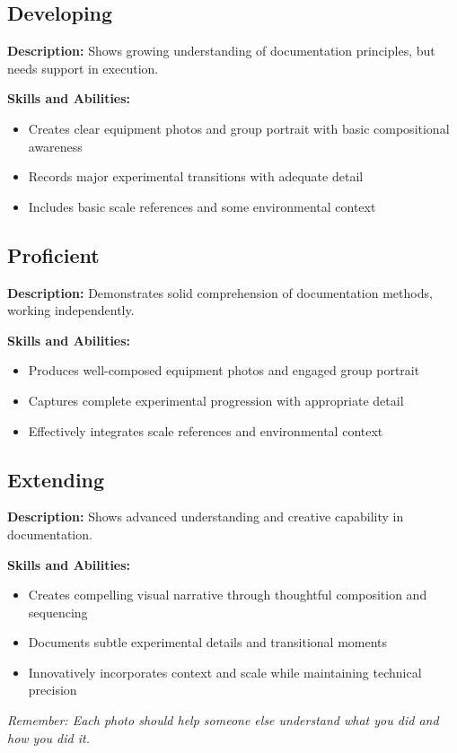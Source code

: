 \documentclass[11pt]{article}
\begin{document}
\subsection*{Developing}
\textbf{Description:} Shows growing understanding of documentation principles, but needs support in execution.

\noindent\textbf{Skills and Abilities:}
\begin{itemize}[leftmargin=*]
    \item Creates clear equipment photos and group portrait with basic compositional awareness
    \item Records major experimental transitions with adequate detail
    \item Includes basic scale references and some environmental context
\end{itemize}

\subsection*{Proficient}
\textbf{Description:} Demonstrates solid comprehension of documentation methods, working independently.

\noindent\textbf{Skills and Abilities:}
\begin{itemize}[leftmargin=*]
    \item Produces well-composed equipment photos and engaged group portrait
    \item Captures complete experimental progression with appropriate detail
    \item Effectively integrates scale references and environmental context
\end{itemize}

\subsection*{Extending}
\textbf{Description:} Shows advanced understanding and creative capability in documentation.

\noindent\textbf{Skills and Abilities:}
\begin{itemize}[leftmargin=*]
    \item Creates compelling visual narrative through thoughtful composition and sequencing
    \item Documents subtle experimental details and transitional moments
    \item Innovatively incorporates context and scale while maintaining technical precision
\end{itemize}

\vspace{1em}
\noindent\emph{Remember: Each photo should help someone else understand what you did and how you did it.}
\end{document}
